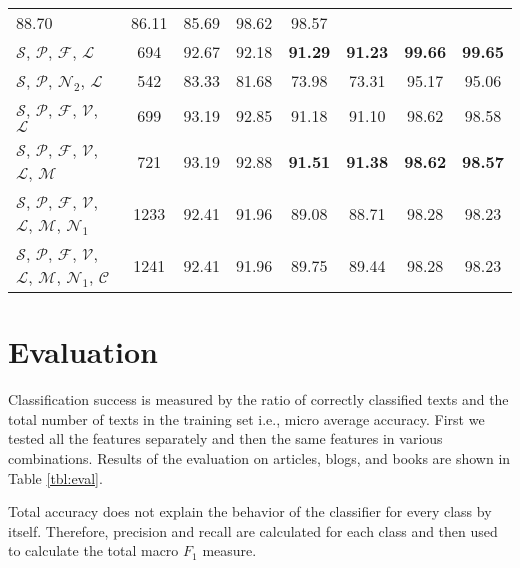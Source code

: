 \documentclass{llncs}
\begin{document}
\begin{table*}[htb]
\begin{tabular}{l c c c c c c c}
88.70 & 86.11 & 85.69 & 98.62 & 98.57 \\ $\mathcal{S}$, $\mathcal{P}$, $\mathcal{F}$,
$\mathcal{L}$ & 694 & 92.67 & 92.18 & \textbf{91.29} & \textbf{91.23} &
\textbf{99.66} & \textbf{99.65} \\ $\mathcal{S}$, $\mathcal{P}$,
$\mathcal{N}_2$, $\mathcal{L}$ & 542 & 83.33 & 81.68 & 73.98 & 73.31 & 95.17 &
95.06 \\ $\mathcal{S}$, $\mathcal{P}$, $\mathcal{F}$, $\mathcal{V}$,
$\mathcal{L}$ & 699 & 93.19 & 92.85 & 91.18 & 91.10 & 98.62 & 98.58 \\
$\mathcal{S}$, $\mathcal{P}$, $\mathcal{F}$, $\mathcal{V}$, $\mathcal{L}$,
$\mathcal{M}$ & 721 & 93.19 & 92.88 & \textbf{91.51} & \textbf{91.38} &
\textbf{98.62} & \textbf{98.57} \\ $\mathcal{S}$, $\mathcal{P}$, $\mathcal{F}$, $\mathcal{V}$,
$\mathcal{L}$, $\mathcal{M}$, $\mathcal{N}_1$ & 1233 & 92.41 & 91.96 & 89.08 &
88.71 & 98.28 & 98.23 \\ $\mathcal{S}$, $\mathcal{P}$, $\mathcal{F}$,
$\mathcal{V}$, $\mathcal{L}$, $\mathcal{M}$, $\mathcal{N}_1$, $\mathcal{C}$ &
1241 & 92.41 & 91.96 & 89.75 & 89.44 & 98.28 & 98.23 \\
\bottomrule
\end{tabular}
\label{tbl:eval}
\end{table*}

\section{Evaluation}
\label{sec:evaluacija}
Classification success is measured by the ratio of correctly classified texts and
the total number of texts in the training set i.e., micro average accuracy.
First we tested all the features separately and then the same features in
various combinations. Results of the evaluation on articles, blogs, and books
are shown in Table \ref{tbl:eval}.

Total accuracy does not explain the behavior of the classifier for every class by
itself. Therefore, precision and recall are calculated for each class and then
used to calculate the total macro $F_1$ measure. 
% 
\end{document}
